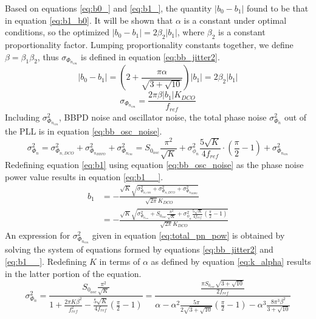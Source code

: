 	Based on equations \ref{eq:b0_} and \ref{eq:b1_}, the quantity $|b_0-b_1|$ found to be that in equation \ref{eq:b1_b0}. It will be shown that $\alpha$ is a constant under optimal conditions, so the optimized $|b_0-b_1| = 2\beta_2|b_1|$, where $\beta_2$ is a constant proportionality factor. Lumping proportionality constants together, we define $\beta = \beta_1\beta_2$, thus $\sigma_{\Phi_{n_{em}}}$ is defined in equation \ref{eq:bb_jitter2}.
	\begin{equation}\label{eq:b1_b0}
			|b_0-b_1| = \left(2 + \frac{\pi \alpha}{\sqrt{3+\sqrt{10}}}\right)|b_1| = 2\beta_2|b_1|
	\end{equation}
	\begin{equation}\label{eq:bb_jitter2}
		\sigma_{\Phi_{n_{em}}} = \frac{2\pi \beta |b_1|K_{DCO}}{f_{ref}}
	\end{equation}	
	Including $\sigma^2_{\Phi_{n_{em}}}$, BBPD noise and oscillator noise, the total phase noise $\sigma^2_{\Phi_{n}}$ out of the PLL is in equation \ref{eq:bb_osc_noise}.
	\begin{equation}\label{eq:bb_osc_noise}
		\sigma_{\Phi_{n}}^2 = \sigma_{\Phi_{n,DCO}}^2 + \sigma^2_{\Phi_{n_{BBPD}}} + \sigma^2_{\Phi_{n_{em}}} = S_{0_{osc}}\frac{\pi^2}{\sqrt{K}} + \sigma^2_{\phi_n}\frac{5\sqrt{K}}{4f_{ref}}\cdot\left(\frac{\pi}{2}-1\right)  + \sigma^2_{\Phi_{n_{em}}}
	\end{equation}
	Redefining equation \ref{eq:b1} using equation \ref{eq:bb_osc_noise} as the phase noise power value results in equation \ref{eq:b1__}.
		\begin{align}\label{eq:b1__}
			 b_1 &=  - \frac{\sqrt{K}\sqrt{\sigma_{\Phi_{n,em}}^2 + \sigma_{\Phi_{n,DCO}}^2 + \sigma^2_{\Phi_{n_{BBPD}}} }}{\sqrt{2\pi}K_{DCO}} \\
			 & = - \frac{\sqrt{K}\sqrt{ \sigma^2_{\Phi_{n_{em}}} +  S_{0_{osc}}\frac{\pi^2}{\sqrt{K}} + \sigma^2_{\phi_n}\frac{5\sqrt{K}}{4f_{ref}}\left(\frac{\pi}{2}-1\right)}  }{\sqrt{2\pi}K_{DCO}}
		\end{align}
	An expression for $\sigma^2_{\Phi_{n_{em}}}$ given in equation \ref{eq:total_pn_pow} is obtained by solving the system of equations formed by equations \ref{eq:bb_jitter2} and \ref{eq:b1__}. Redefining $K$ in terms of $\alpha$ as defined by equation \ref{eq:k_alpha} results in the latter portion of the equation.
	 	\begin{equation}\label{eq:total_pn_pow}
	 		\sigma^2_{\Phi_{n}} = \frac{S_{0_{osc}}\frac{\pi^2}{\sqrt{K}}}{1 + \frac{2\pi K \beta^2}{f_{ref}^2} - \frac{5\sqrt{K}}{4f_{ref}} \left(\frac{\pi}{2}-1\right)}  
	 		= \frac{\frac{\pi S_{0_{osc}}\sqrt{3+\sqrt{10}}}{2f_{ref}}}{\alpha - \alpha^2\frac{5\pi}{2\sqrt{3+\sqrt{10}}}\left(\frac{\pi}{2}-1\right) - \alpha^3 \frac{8\pi^3\beta^2}{3+\sqrt{10}}}
	 	\end{equation}
